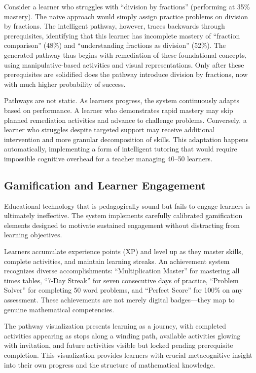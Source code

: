 \documentclass[12pt,a4paper]{article}
\begin{document}
Consider a learner who struggles with ``division by fractions'' (performing at 35\% mastery). The naive approach would simply assign practice problems on division by fractions. The intelligent pathway, however, traces backwards through prerequisites, identifying that this learner has incomplete mastery of ``fraction comparison'' (48\%) and ``understanding fractions as division'' (52\%). The generated pathway thus begins with remediation of these foundational concepts, using manipulative-based activities and visual representations. Only after these prerequisites are solidified does the pathway introduce division by fractions, now with much higher probability of success.

Pathways are not static. As learners progress, the system continuously adapts based on performance. A learner who demonstrates rapid mastery may skip planned remediation activities and advance to challenge problems. Conversely, a learner who struggles despite targeted support may receive additional intervention and more granular decomposition of skills. This adaptation happens automatically, implementing a form of intelligent tutoring that would require impossible cognitive overhead for a teacher managing 40--50 learners.

\subsection{Gamification and Learner Engagement}

Educational technology that is pedagogically sound but fails to engage learners is ultimately ineffective. The system implements carefully calibrated gamification elements designed to motivate sustained engagement without distracting from learning objectives.

Learners accumulate experience points (XP) and level up as they master skills, complete activities, and maintain learning streaks. An achievement system recognizes diverse accomplishments: ``Multiplication Master'' for mastering all times tables, ``7-Day Streak'' for seven consecutive days of practice, ``Problem Solver'' for completing 50 word problems, and ``Perfect Score'' for 100\% on any assessment. These achievements are not merely digital badges---they map to genuine mathematical competencies.

The pathway visualization presents learning as a journey, with completed activities appearing as stops along a winding path, available activities glowing with invitation, and future activities visible but locked pending prerequisite completion. This visualization provides learners with crucial metacognitive insight into their own progress and the structure of mathematical knowledge.
\end{document}
